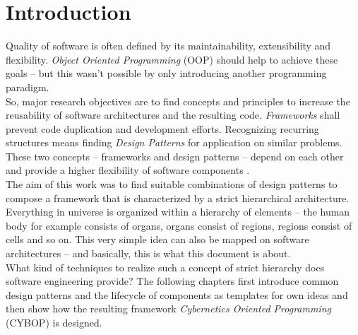 %
%
%
%
%
%
%

\section{Introduction}
\label{introduction_heading}

Quality of software is often defined by its maintainability, extensibility and
flexibility. \emph{Object Oriented Programming} (OOP) should help to achieve
these goals -- but this wasn't possible by only introducing another programming
paradigm.\\
So, major research objectives are to find concepts and principles to increase
the reusability of software architectures and the resulting code. \emph{Frameworks}
shall prevent code duplication and development efforts. Recognizing recurring
structures means finding \emph{Design Patterns} for application on similar problems.
These two concepts -- frameworks and design patterns -- depend on each other and
provide a higher flexibility of software components \cite{pree}.\\
The aim of this work was to find suitable combinations of design patterns to
compose a framework that is characterized by a strict hierarchical architecture.
Everything in universe is organized within a hierarchy of elements -- the human
body for example consists of organs, organs consist of regions, regions consist
of cells and so on. This very simple idea can also be mapped on software
architectures -- and basically, this is what this document is about.\\
What kind of techniques to realize such a concept of strict hierarchy does software
engineering provide? The following chapters first introduce common design patterns
and the lifecycle of components as templates for own ideas and then show how the
resulting framework \emph{Cybernetics Oriented Programming} (CYBOP) \cite{cybop}
is designed.

